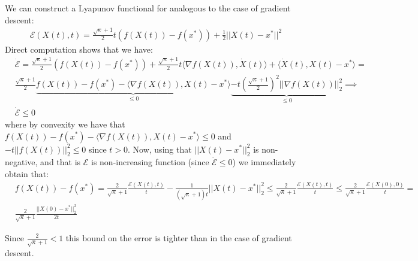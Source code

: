 We can construct a Lyapunov functional for analogous to the case of gradient descent:
\begin{align*}
    \mathcal{E}(X(t), t) = \frac{\sqrt{\kappa}+1}{2}t(f(X(t)) - f(x^*)) + \frac{1}{2}||X(t)-x^*||^2
\end{align*}
Direct computation shows that we have:
\begin{align*}
    & \dot{\mathcal{E}}= \frac{\sqrt{\kappa}+1}{2}(f(X(t)) - f(x^*)) + \frac{\sqrt{\kappa}+1}{2} t \langle \nabla f(X(t)), \dot{X}(t) \rangle + \langle \dot{X}(t), X(t)-x^* \rangle = \\
    & \frac{\sqrt{\kappa}+1}{2} \underbrace{f(X(t)) - f(x^*) - \langle \nabla f(X(t)), X(t) - x^* \rangle}_{\leq 0} \underbrace{- t (\frac{\sqrt{\kappa}+1}{2})^2 || \nabla f(X(t))||_2^2}_{\leq 0} \implies \\
    & \dot{\mathcal{E}} \leq 0
\end{align*}
where by convexity we have that $f(X(t)) - f(x^*) - \langle \nabla f(X(t)), X(t) - x^* \rangle \leq 0$ and $ - t ||f(X(t))||_2^2 \leq 0$ since $t>0$. Now, using that $||X(t)-x^*||_2^2$ is non-negative, and that is $\mathcal{E}$ is non-increasing function (since $\dot{\mathcal{E}} \leq 0$) we immediately obtain that:
\begin{align*}
    & f(X(t)) - f(x^*) = \frac{2}{\sqrt{\kappa}+1} \frac{\mathcal{E}(X(t), t)}{t} - \frac{1}{(\sqrt{\kappa}+1)t} ||X(t) - x^*||_2^2 \leq \frac{2}{\sqrt{\kappa}+1} \frac{\mathcal{E}(X(t), t)}{t} \leq \frac{2}{\sqrt{\kappa}+1} \frac{\mathcal{E}(X(0), 0)}{t} = \\ & \frac{2}{\sqrt{\kappa}+1} \frac{||X(0)-x^*||_2^2}{2t}
\end{align*}

Since $\frac{2}{\sqrt{\kappa}+1} < 1$ this bound on the error is tighter than in the case of gradient descent.






